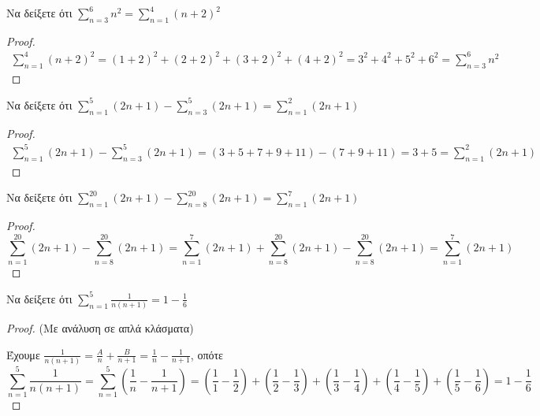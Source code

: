 \begin{example}
  Να δείξετε ότι $ \sum_{n=3}^{6} n^{2} = \sum_{n=1}^{4} (n+2)^{2}   $
\end{example}
\begin{proof}
  \begin{align*}
    \sum_{n=1}^{4} (n+2)^{2} = (1+2)^{2}+(2+2)^{2}+(3+2)^{2}+(4+2)^{2}=
    3^{2}+4^{2}+5^{2}+6^{2} = \sum_{n=3}^{6} n^{2} 
  \end{align*}
\end{proof}

\begin{example}
  Να δείξετε ότι $ \sum_{n=1}^{5} (2n+1) - \sum_{n=3}^{5} (2n+1)  =  
  \sum_{n=1}^{2} (2n+1) $
\end{example}
\begin{proof}
  \begin{align*}
    \sum_{n=1}^{5} (2n+1)- \sum_{n=3}^{5} (2n+1) = 
    (3+5+7+9+11) - (7+9+11) = 3 + 5 = \sum_{n=1}^{2} (2n+1) 
  \end{align*}
\end{proof}

\begin{example}
  Να δείξετε ότι $ \sum_{n=1}^{20} (2n+1) - \sum_{n=8}^{20} (2n+1) = \sum_{n=1}^{7} 
  (2n+1) $ 
\end{example}
\begin{proof}
\item 
  \[
    \sum_{n=1}^{20} (2n+1) - \sum_{n=8}^{20} (2n+1) = \sum_{n=1}^{7} (2n+1) + 
    \sum_{n=8}^{20} (2n+1) - \sum_{n=8}^{20} (2n+1) = 
    \sum_{n=1}^{7} (2n+1)
  \]
\end{proof}

\begin{example}
  Να δείξετε ότι $ \sum_{n=1}^{5} \frac{1}{n(n+1)} = 1 - \frac{1}{6}  $
\end{example}
\begin{proof}(Με ανάλυση σε απλά κλάσματα)
\item {}
  Έχουμε $ \frac{1}{n(n+1)} = \frac{A}{n} + \frac{B}{n+1} = 
  \frac{1}{n} - \frac{1}{n+1}$, οπότε
  \begin{equation*}
    \sum_{n=1}^{5} \frac{1}{n(n+1)} = \sum_{n=1}^{5} \left(\frac{1}{n} - 
    \frac{1}{n+1}\right)    
    = \left(\frac{1}{1} - \frac{1}{2}\right) + \left(\frac{1}{2} 
    - \frac{1}{3} \right) + \left(\frac{1}{3} - \frac{1}{4}\right) 
    + \left(\frac{1}{4} - \frac{1}{5}\right) +
    \left(\frac{1}{5} - \frac{1}{6}\right)  = 1 - \frac{1}{6}
  \end{equation*} 
\end{proof}

